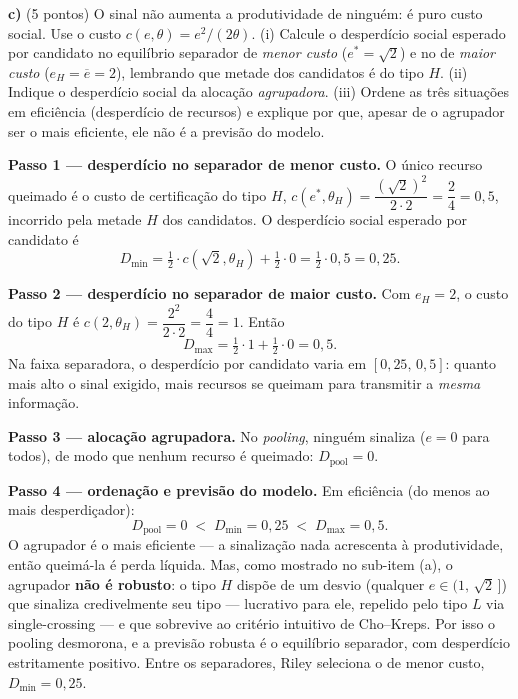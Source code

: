 \textbf{c)} (5 pontos) O sinal n\~ao aumenta a produtividade de ningu\'em: \'e puro custo social. Use o custo $c(e,\theta)=e^{2}/(2\theta)$. (i) Calcule o desperd\'icio social esperado por candidato no equil\'ibrio separador de \emph{menor custo} ($e^{*}=\sqrt{2}$) e no de \emph{maior custo} ($e_H=\overline e=2$), lembrando que metade dos candidatos \'e do tipo $H$. (ii) Indique o desperd\'icio social da aloca\c{c}\~ao \emph{agrupadora}. (iii) Ordene as tr\^es situa\c{c}\~oes em efici\^encia (desperd\'icio de recursos) e explique por que, apesar de o agrupador ser o mais eficiente, ele n\~ao \'e a previs\~ao do modelo.
\resolucaobox{5.5cm}
\begin{solucao}
\textbf{Passo 1 --- desperd\'icio no separador de menor custo.} O \'unico recurso queimado \'e o custo de certifica\c{c}\~ao do tipo $H$, $c(e^{*},\theta_H)=\dfrac{(\sqrt{2})^{2}}{2\cdot 2}=\dfrac{2}{4}=0{,}5$, incorrido pela metade $H$ dos candidatos. O desperd\'icio social esperado por candidato \'e
\[
D_{\min}=\tfrac12\cdot c(\sqrt{2},\theta_H)+\tfrac12\cdot 0=\tfrac12\cdot 0{,}5=0{,}25.
\]

\textbf{Passo 2 --- desperd\'icio no separador de maior custo.} Com $e_H=2$, o custo do tipo $H$ \'e $c(2,\theta_H)=\dfrac{2^{2}}{2\cdot 2}=\dfrac{4}{4}=1$. Ent\~ao
\[
D_{\max}=\tfrac12\cdot 1+\tfrac12\cdot 0=0{,}5.
\]
Na faixa separadora, o desperd\'icio por candidato varia em $[0{,}25,\,0{,}5]$: quanto mais alto o sinal exigido, mais recursos se queimam para transmitir a \emph{mesma} informa\c{c}\~ao.

\textbf{Passo 3 --- aloca\c{c}\~ao agrupadora.} No \emph{pooling}, ningu\'em sinaliza ($e=0$ para todos), de modo que nenhum recurso \'e queimado: $D_{\text{pool}}=0$.

\textbf{Passo 4 --- ordena\c{c}\~ao e previs\~ao do modelo.} Em efici\^encia (do menos ao mais desperdi\c{c}ador):
\[
D_{\text{pool}}=0\;<\;D_{\min}=0{,}25\;<\;D_{\max}=0{,}5.
\]
O agrupador \'e o mais eficiente --- a sinaliza\c{c}\~ao nada acrescenta \`a produtividade, ent\~ao queim\'a-la \'e perda l\'iquida. Mas, como mostrado no sub-item (a), o agrupador \textbf{n\~ao \'e robusto}: o tipo $H$ disp\~oe de um desvio (qualquer $e\in(1,\,\sqrt{2}\,]$) que sinaliza credivelmente seu tipo --- lucrativo para ele, repelido pelo tipo $L$ via single-crossing --- e que sobrevive ao crit\'erio intuitivo de Cho--Kreps. Por isso o pooling desmorona, e a previs\~ao robusta \'e o equil\'ibrio separador, com desperd\'icio estritamente positivo. Entre os separadores, Riley seleciona o de menor custo, $D_{\min}=0{,}25$.


\end{solucao}
